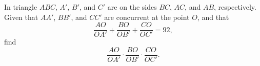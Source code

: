 In triangle $ABC$, $A'$, $B'$, and $C'$ are on the sides $BC$, $AC$, and $AB$, respectively. Given that $AA'$, $BB'$, and $CC'$ are concurrent at the point $O$, and that \[\frac{AO}{OA'}+\frac{BO}{OB'}+\frac{CO}{OC'}=92,\]find \[\frac{AO}{OA'}\cdot \frac{BO}{OB'}\cdot \frac{CO}{OC'}.\]